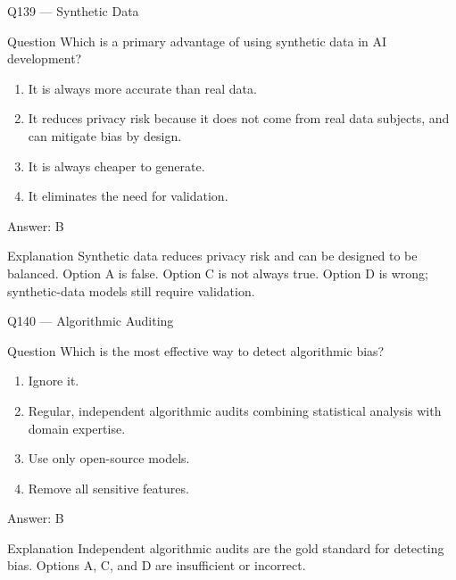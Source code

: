 \documentclass[aspectratio=169,8pt]{beamer}
\begin{document}
\begin{frame}{Q139 --- Synthetic Data}
\begin{block}{Question}
Which is a primary advantage of using synthetic data in AI development?
\begin{enumerate}
\item It is always more accurate than real data.
\item It reduces privacy risk because it does not come from real data subjects, and can mitigate bias by design.
\item It is always cheaper to generate.
\item It eliminates the need for validation.
\end{enumerate} 	\end{block}
\begin{exampleblock}{Answer: B}\end{exampleblock}
\begin{block}{Explanation}
Synthetic data reduces privacy risk and can be designed to be balanced. Option A is false. Option C is not always true. Option D is wrong; synthetic-data models still require validation.
\end{block}
\end{frame}

\begin{frame}{Q140 --- Algorithmic Auditing}
\begin{block}{Question}
Which is the most effective way to detect algorithmic bias?
\begin{enumerate}
\item Ignore it.
\item Regular, independent algorithmic audits combining statistical analysis with domain expertise.
\item Use only open-source models.
\item Remove all sensitive features.
\end{enumerate} 	\end{block}
\begin{exampleblock}{Answer: B}\end{exampleblock}
\begin{block}{Explanation}
Independent algorithmic audits are the gold standard for detecting bias. Options A, C, and D are insufficient or incorrect.
\end{block}
\end{frame}
\end{document}

